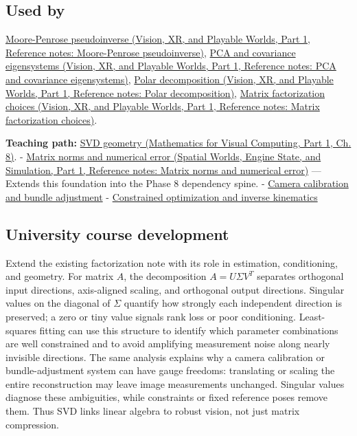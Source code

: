 \subsection{Used by}\label{appendix-1fad5e7f36fa-used-by}

\hypertarget{appendix-1fad5e7f36fa-used-by}{}

\href{../07-Vision-XR-and-Playable-Worlds-P01/main.pdf\#nameddest=appendix-541306fdbc1b}{Moore-Penrose pseudoinverse (Vision, XR, and Playable Worlds, Part 1, Reference notes: Moore-Penrose pseudoinverse)}, \href{../07-Vision-XR-and-Playable-Worlds-P01/main.pdf\#nameddest=appendix-ad175ef3c5bf}{PCA and covariance eigensystems (Vision, XR, and Playable Worlds, Part 1, Reference notes: PCA and covariance eigensystems)}, \href{../07-Vision-XR-and-Playable-Worlds-P01/main.pdf\#nameddest=appendix-73f5bcf7a462}{Polar decomposition (Vision, XR, and Playable Worlds, Part 1, Reference notes: Polar decomposition)}, \href{../07-Vision-XR-and-Playable-Worlds-P01/main.pdf\#nameddest=appendix-221a483bec2d}{Matrix factorization choices (Vision, XR, and Playable Worlds, Part 1, Reference notes: Matrix factorization choices)}.

\textbf{Teaching path:} \href{../02-Mathematics-for-Visual-Computing-P01/main.pdf\#nameddest=02-foundations-ii-ch024-singular-value-decomposition-covers-every-rectangular-map}{SVD geometry (Mathematics for Visual Computing, Part 1, Ch. 8)}. - \href{../05-Spatial-Worlds-Engine-State-and-Simulation-P01/main.pdf\#nameddest=appendix-f8657bac66e5}{Matrix norms and numerical error (Spatial Worlds, Engine State, and Simulation, Part 1, Reference notes: Matrix norms and numerical error)} --- Extends this foundation into the Phase 8 dependency spine. - \hyperref[appendix-3ee9861904d5]{Camera calibration and bundle adjustment} - \hyperref[appendix-29f4bea4c2bb]{Constrained optimization and inverse kinematics}

\subsection{University course development}\label{appendix-1fad5e7f36fa-university-course-development}

\hypertarget{appendix-1fad5e7f36fa-university-course-development}{}

Extend the existing factorization note with its role in estimation, conditioning, and geometry. For matrix \(A\), the decomposition \(A=U\Sigma V^T\) separates orthogonal input directions, axis-aligned scaling, and orthogonal output directions. Singular values on the diagonal of \(\Sigma\) quantify how strongly each independent direction is preserved; a zero or tiny value signals rank loss or poor conditioning. Least-squares fitting can use this structure to identify which parameter combinations are well constrained and to avoid amplifying measurement noise along nearly invisible directions. The same analysis explains why a camera calibration or bundle-adjustment system can have gauge freedoms: translating or scaling the entire reconstruction may leave image measurements unchanged. Singular values diagnose these ambiguities, while constraints or fixed reference poses remove them. Thus SVD links linear algebra to robust vision, not just matrix compression.

